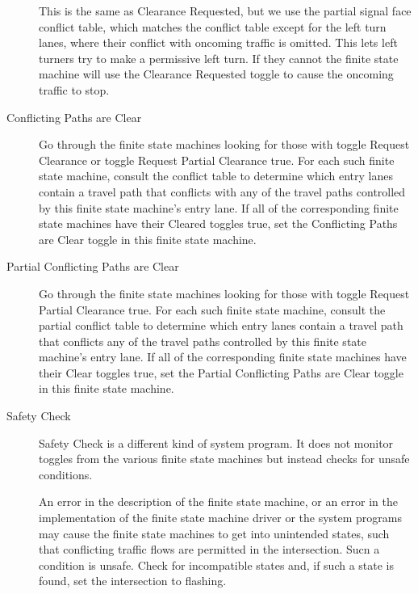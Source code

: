 \documentclass[letterpaper,twoside]{article}
\begin{document}
\begin{description}
  This is the same as Clearance Requested, but we use the partial signal face
  conflict table, which matches the conflict table except
  for the left turn lanes, where their conflict with oncoming traffic is
  omitted.
  This lets left turners try to make a permissive left turn.
  If they cannot the finite state machine will use the Clearance Requested
  toggle to cause the oncoming traffic to stop.

\item[Conflicting Paths are Clear]

  Go through the finite state machines looking for those with toggle
  Request Clearance
  or toggle Request Partial Clearance
  true.  For each such finite state machine, consult the conflict table
  to determine which entry lanes contain a travel path that conflicts
  with any of the travel paths controlled by this finite state machine's
  entry lane.  If all of the
  corresponding finite state machines have their Cleared toggles true,
  set the Conflicting Paths
  are Clear toggle in this finite state machine.

\item[Partial Conflicting Paths are Clear]

  Go through the finite state machines looking for those with toggle
  Request Partial
  Clearance true.  For each such finite state machine, consult the partial
  conflict table to determine which entry lanes contain a travel path
  that conflicts any of the travel paths controlled by this finite state
  machine's entry lane.  If all of the corresponding finite state machines
  have their Clear toggles
  true, set the Partial Conflicting Paths are Clear toggle in this
  finite state machine.

\item[Safety Check]

  Safety Check is a different kind of system program.  It does not
  monitor toggles from the various finite state machines but instead checks
  for unsafe conditions.  
  
  An error in the description of the finite state machine, or an error
  in the implementation of the finite state machine driver or the
  system programs may cause the finite state machines to get into unintended
  states, such that conflicting traffic flows are permitted in the
  intersection.  Sucn a condition is unsafe.  Check for incompatible
  states and, if such a state is found, set the intersection to flashing.

\end{description}
\end{document}
